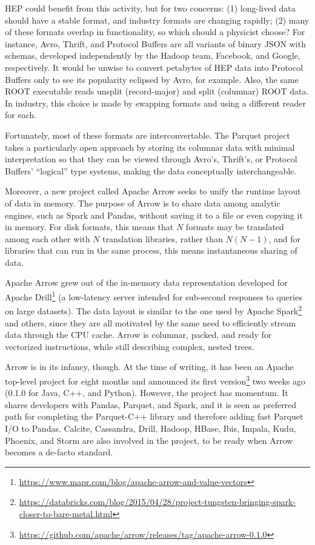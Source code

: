 \documentclass{article}
\begin{document}
HEP could benefit from this activity, but for two concerns: (1) long-lived data should have a stable format, and industry formats are changing rapidly; (2) many of these formats overlap in functionality, so which should a physicist choose? For instance, Avro, Thrift, and Protocol Buffers are all variants of binary JSON with schemas, developed independently by the Hadoop team, Facebook, and Google, respectively. It would be unwise to convert petabytes of HEP data into Protocol Buffers only to see its popularity eclipsed by Avro, for example. Also, the same ROOT executable reads unsplit (record-major) and split (columnar) ROOT data. In industry, this choice is made by swapping formats and using a different reader for each.

Fortunately, most of these formats are interconvertable. The Parquet project takes a particularly open approach by storing its columnar data with minimal interpretation so that they can be viewed through Avro's, Thrift's, or Protocol Buffers' ``logical'' type systems, making the data conceptually interchangeable.

Moreover, a new project called Apache Arrow seeks to unify the runtime layout of data in memory. The purpose of Arrow is to share data among analytic engines, such as Spark and Pandas, without saving it to a file or even copying it in memory. For disk formats, this means that $N$ formats may be translated among each other with $N$ translation libraries, rather than $N(N - 1)$, and for libraries that can run in the same process, this means instantaneous sharing of data.

Apache Arrow grew out of the in-memory data representation developed for Apache Drill\footnote{\url{https://www.mapr.com/blog/apache-arrow-and-value-vectors}} (a low-latency server intended for sub-second responses to queries on large datasets). The data layout is similar to the one used by Apache Spark\footnote{\url{https://databricks.com/blog/2015/04/28/project-tungsten-bringing-spark-closer-to-bare-metal.html}} and others, since they are all motivated by the same need to efficiently stream data through the CPU cache. Arrow is columnar, packed, and ready for vectorized instructions, while still describing complex, nested trees.

Arrow is in its infancy, though. At the time of writing, it has been an Apache top-level project for eight months and announced its first version\footnote{\url{https://github.com/apache/arrow/releases/tag/apache-arrow-0.1.0}} two weeks ago (0.1.0 for Java, C++, and Python). However, the project has momentum. It shares developers with Pandas, Parquet, and Spark, and it is seen as preferred path for completing the Parquet-C++ library and therefore adding fast Parquet I/O to Pandas. Calcite, Cassandra, Drill, Hadoop, HBase, Ibis, Impala, Kudu, Phoenix, and Storm are also involved in the project, to be ready when Arrow becomes a de-facto standard.
\end{document}
